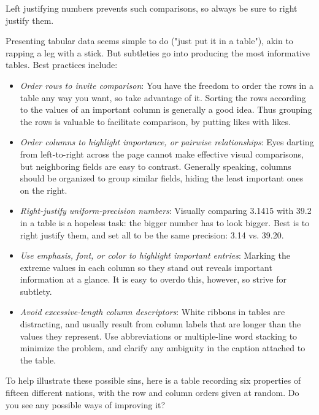 \documentclass[10pt]{article}
\begin{document}
Left justifying numbers prevents such comparisons, so always be sure to right justify them.

Presenting tabular data seems simple to do ("just put it in a table"), akin to rapping a leg with a stick. But subtleties go into producing the most informative tables. Best practices include:
\begin{itemize}
  \item \emph{Order rows to invite comparison}: You have the freedom to order the rows in a table any way you want, so take advantage of it. Sorting the rows according to the values of an important column is generally a good idea. Thus grouping the rows is valuable to facilitate comparison, by putting likes with likes.
  \item \emph{Order columns to highlight importance, or pairwise relationships}: Eyes darting from left-to-right across the page cannot make effective visual comparisons, but neighboring fields are easy to contrast. Generally speaking, columns should be organized to group similar fields, hiding the least important ones on the right.
  \item \emph{Right-justify uniform-precision numbers}: Visually comparing 3.1415 with 39.2 in a table is a hopeless task: the bigger number has to look bigger. Best is to right justify them, and set all to be the same precision: 3.14 vs. 39.20.
  \item \emph{Use emphasis, font, or color to highlight important entries}: Marking the extreme values in each column so they stand out reveals important information at a glance. It is easy to overdo this, however, so strive for subtlety.
  \item \emph{Avoid excessive-length column descriptors}: White ribbons in tables are distracting, and usually result from column labels that are longer than the values they represent. Use abbreviations or multiple-line word stacking to minimize the problem, and clarify any ambiguity in the caption attached to the table.
\end{itemize}

To help illustrate these possible sins, here is a table recording six properties of fifteen different nations, with the row and column orders given at random. Do you see any possible ways of improving it?
\end{document}
